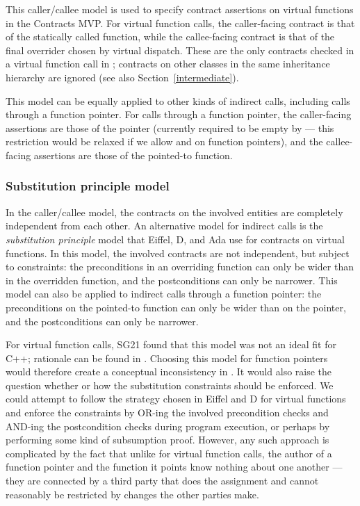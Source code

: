 This caller/callee model is used to specify contract assertions on virtual functions in the Contracts MVP. For virtual function calls, the caller-facing contract is that of the statically called function, while the callee-facing contract is that of the final overrider chosen by virtual dispatch. These are the only contracts checked in a virtual function call in \cite{P2900R9}; contracts on other classes in the same inheritance hierarchy are ignored (see also Section~\ref{intermediate}).

This model can be equally applied to other kinds of indirect calls, including calls through a function pointer. For calls through a function pointer, the caller-facing assertions are those of the pointer (currently required to be empty by \cite{P2900R9} --- this restriction would be relaxed if we allow  and  on function pointers), and the callee-facing assertions are those of the pointed-to function. 

\subsubsection{Substitution principle model}
\label{submodel}

In the caller/callee model, the contracts on the involved entities are completely independent from each other. An alternative model for indirect calls is the \emph{substitution principle} model that Eiffel, D, and Ada use for contracts on virtual functions. In this model, the involved contracts are not independent, but subject to constraints: the preconditions in an overriding function can only be wider than in the overridden function, and the postconditions can only be narrower. This model can also be applied to indirect calls through a function pointer: the preconditions on the pointed-to function can only be wider than on the pointer, and the postconditions can only be narrower.

For virtual function calls, SG21 found that this model was not an ideal fit for C++; rationale can be found in \cite{P3097R0}. Choosing this model for function pointers would therefore create a conceptual inconsistency in \cite{P2900R9}. It would also raise the question whether or how the substitution constraints should be enforced. We could attempt to follow the strategy chosen in Eiffel and D for virtual functions and enforce the constraints by OR-ing the involved precondition checks and AND-ing the postcondition checks during program execution, or perhaps by performing some kind of subsumption proof. However, any such approach is complicated by the fact that unlike for virtual function calls, the author of a function pointer and the function it points know nothing about one another --- they are connected by a third party that does the assignment and cannot reasonably be restricted by changes the other parties make.

